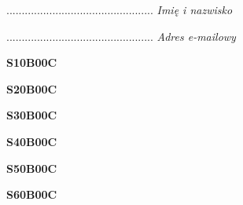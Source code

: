 \begin{turn}{90}\begin{minipage}{\linewidth} \vspace{20mm} ................................................  \textit{Imię i nazwisko}\end{minipage}\end{turn}

\begin{turn}{90}\begin{minipage}{\linewidth} \vspace{20mm} ................................................  \textit{Adres e-mailowy}\end{minipage}\end{turn}

\begin{turn}{90}\huge \begin{minipage}{\linewidth} \vspace{10mm}\textbf{S10B00C}\end{minipage}\end{turn}

\begin{turn}{90}\huge \begin{minipage}{\linewidth} \vspace{10mm}\textbf{S20B00C}\end{minipage}\end{turn}

\begin{turn}{90}\huge \begin{minipage}{\linewidth} \vspace{10mm}\textbf{S30B00C}\end{minipage}\end{turn}

\begin{turn}{90}\huge \begin{minipage}{\linewidth} \vspace{10mm}\textbf{S40B00C}\end{minipage}\end{turn}

\begin{turn}{90}\huge \begin{minipage}{\linewidth} \vspace{10mm}\textbf{S50B00C}\end{minipage}\end{turn}

\begin{turn}{90}\huge \begin{minipage}{\linewidth} \vspace{10mm}\textbf{S60B00C}\end{minipage}\end{turn}

